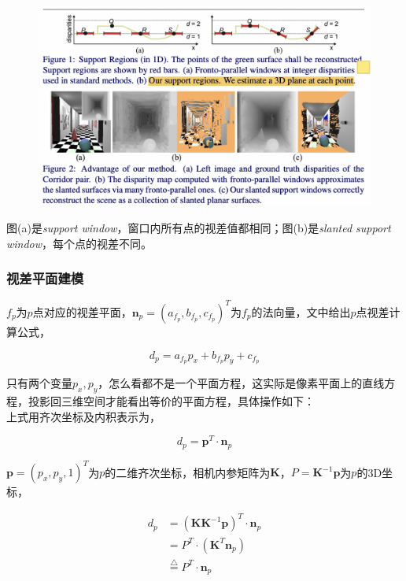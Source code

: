 \begin{figure}[H]
	\begin{center}
		\includegraphics[width=\textwidth]{../images/slanted_window.png}
	\end{center}
\end{figure}

图(a)是\textit{support window}，窗口内所有点的视差值都相同；图(b)是\textit{slanted support window}，每个点的视差不同。

\subsubsection*{视差平面建模}

$f_p$为$p$点对应的视差平面，$\mathbf{n}_p = (a_{f_p}, b_{f_p}, c_{f_p})^T$为$f_p$的法向量，文中给出$p$点视差计算公式，

\begin{equation}
	d_p = a_{f_p}p_x + b_{f_p}p_y+c_{f_p}\label{disparity_eq}
\end{equation}

只有两个变量$p_x,p_y$，怎么看都不是一个平面方程，这实际是像素平面上的直线方程，投影回三维空间才能看出等价的平面方程，具体操作如下：\\

上式用齐次坐标及内积表示为，

$$
	d_p = \mathbf{p}^T\cdot \mathbf{n}_p
$$

$\mathbf{p}=(p_x,p_y,1)^T$为$p$的二维齐次坐标，相机内参矩阵为$\mathbf{K}$，$P = \mathbf{K}^{-1}\mathbf{p}$为$p$的3D坐标，

\begin{align*}
		d_p &= \left(\mathbf{K}\mathbf{K}^{-1}\mathbf{p}\right)^T\cdot \mathbf{n}_p \\
			&= P^T\cdot \left(\mathbf{K}^T \mathbf{n}_p\right)\\
			&\overset{\triangle}{=}P^T\cdot \mathbf{n}_p
\end{align*}

